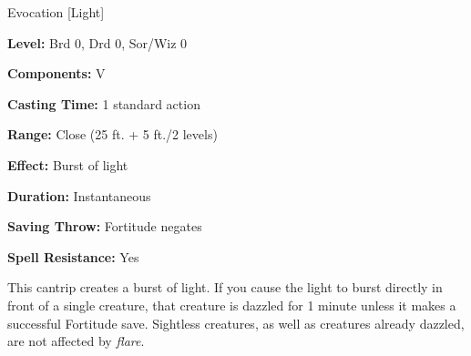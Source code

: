 
Evocation [Light]

\textbf{Level:} Brd 0, Drd 0, Sor/Wiz 0

\textbf{Components:} V

\textbf{Casting Time:} 1 standard action

\textbf{Range:} Close (25 ft. + 5 ft./2 levels)

\textbf{Effect:} Burst of light

\textbf{Duration:} Instantaneous

\textbf{Saving Throw:} Fortitude negates

\textbf{Spell Resistance:} Yes

This cantrip creates a burst of light. If you cause the light to burst directly 
in front of a single creature, that creature is dazzled for 1 minute unless it 
makes a successful Fortitude save. Sightless creatures, as well as creatures already 
dazzled, are not affected by \textit{flare}.

